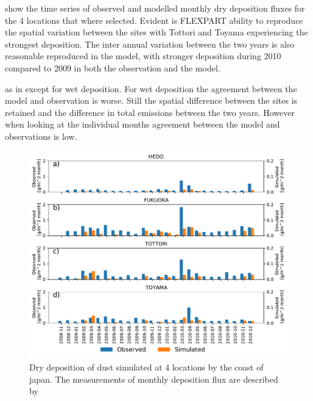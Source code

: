  show the time series of observed and modelled monthly dry deposition fluxes for the 4 locations that where selected. Evident is FLEXPART ability to reproduce the spatial variation between the sites with Tottori and Toyama experiencing the strongest deposition. The inter annual variation between the two years is also reasonable reproduced in the model, with stronger deposition during 2010 compared to 2009 in both the observation and the model. \par {} as in  except for wet deposition. For wet deposition the agreement between the model and observation is worse. Still the spatial difference between the sites is retained and the difference in total emissions between the two years. However when looking at the individual months agreement between the model and observations is low.     
\begin{figure}[hptb]
    \centering
    \includegraphics[width=\textwidth]{texfiles/figs/monthly_accumulated_dry_depostion_japan.pdf}
    \caption{Dry deposition of dust simulated at 4 locations by the coast of japan. The measurements of monthly deposition flux are described by \textcite{osada2014wet}}
    \label{fig:model_eval_dry_deposition}
\end{figure}

